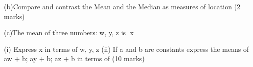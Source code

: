 			(b)Compare and contrast the Mean and the Median as measures of location
			(2 marks)
			
			(c)The mean of three numbers: w, y, z is x
			
			(i) Express x in terms of w, y, z
			(ii)  If a and b are constants express the means of 
			aw + b;   ay + b;   az + b
			in terms of  
			(10 marks)
			
			
			
			
			
	
